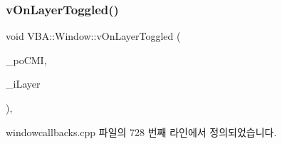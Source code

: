 \subsubsection{\texorpdfstring{v\+On\+Layer\+Toggled()}{vOnLayerToggled()}}
{\footnotesize\ttfamily void V\+B\+A\+::\+Window\+::v\+On\+Layer\+Toggled (\begin{DoxyParamCaption}\item[{Gtk\+::\+Check\+Menu\+Item $\ast$}]{\+\_\+po\+C\+MI,  }\item[{\mbox{\hyperlink{_util_8cpp_a0ef32aa8672df19503a49fab2d0c8071}{int}}}]{\+\_\+i\+Layer }\end{DoxyParamCaption})\hspace{0.3cm}{\ttfamily [protected]}, {\ttfamily [virtual]}}



windowcallbacks.\+cpp 파일의 728 번째 라인에서 정의되었습니다.


